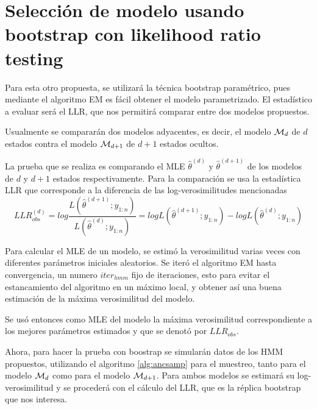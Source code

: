\section{Selección de modelo usando bootstrap con likelihood ratio testing}

Para esta otro propuesta, se utilizará la técnica bootstrap paramétrico, pues mediante el algoritmo \ac{EM} es fácil obtener el modelo parametrizado. El estadístico a evaluar será el \ac{LLR}, que nos permitirá comparar entre dos modelos propuestos. 

Usualmente se compararán dos modelos adyacentes, es decir, el modelo $\mathcal{M}_d$ de $d$ estados contra el modelo $\mathcal{M}_{d+1}$ de $d+1$ estados ocultos.

La prueba que se realiza es comparando el \ac{MLE} $\hat \theta^{(d)}$ y $\hat \theta^{(d+1)}$ de los modelos de $d$ y $d+1$ estados respectivamente. Para la comparación se usa la estadística \ac{LLR} que corresponde a la diferencia de las log-verosimilitudes mencionadas
\begin{equation}
  LLR^{(d)}_{obs} = log \frac{L(\hat \theta^{(d+1)}; y_{1:n})}{L(\hat \theta^{(d)}; y_{1:n})} =
    log L(\hat \theta^{(d+1)}; y_{1:n}) - 
    log L(\hat \theta^{(d)}; y_{1:n})
\end{equation}

Para calcular el \ac{MLE} de un modelo, se estimó la verosimilitud varias veces con diferentes parámetros iniciales aleatorios. Se iteró el algoritmo \ac{EM} hasta convergencia, un numero $iter_{hmm}$ fijo de iteraciones, esto para evitar el estancamiento del algoritmo en un máximo local, y obtener así una buena estimación de la máxima verosimilitud del modelo.

Se usó entonces como \ac{MLE} del modelo la máxima verosimilitud correspondiente a los mejores parámetros estimados y que se denotó por $LLR_{obs}$.

Ahora, para hacer la prueba con boostrap se simularán datos de los \ac{HMM} propuestos, utilizando el algoritmo \ref{alg:ancsamp} para el muestreo, tanto para el modelo $\mathcal{M}_d$ como para el modelo $\mathcal{M}_{d+1}$. Para ambos modelos se estimará su log-verosimilitud y se procederá con el cálculo del \ac{LLR}, que es la réplica bootstrap que nos interesa. 

